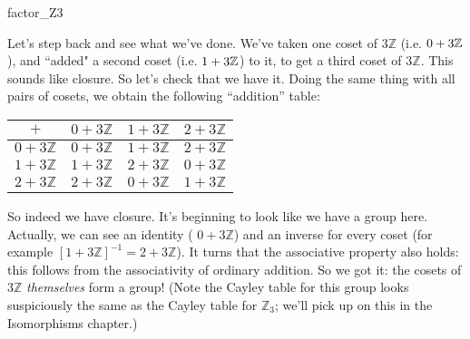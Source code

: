 {\begin{example}{factor_Z3}
%
%
%
%
%

Let's step back and see what we've done. We've taken one coset of $ 3 {\mathbb Z}$ (i.e. $0 + 3\mathbb{Z}$), and ``added" a second coset (i.e. $1 + 3\mathbb{Z}$) to it, to get a third coset of $ 3 {\mathbb Z}$. This sounds like closure.  So let's check that we have it.  Doing the same thing with all pairs of cosets, we obtain the following ``addition'' table: 

\begin{center}
\begin{tabular}{c|ccc}
$+$             & $0 + 3{\mathbb Z}$ & $1 + 3{\mathbb Z}$ & $2 + 3{\mathbb Z}$ \\\hline
$0 + 3{\mathbb Z}$ & $0 + 3{\mathbb Z}$ & $1 + 3{\mathbb Z}$ & $2 + 3{\mathbb Z}$ \\
$1 + 3{\mathbb Z}$ & $1 + 3{\mathbb Z}$ & $2 + 3{\mathbb Z}$ & $0 + 3{\mathbb Z}$ \\
$2 + 3{\mathbb Z}$ & $2 + 3{\mathbb Z}$ & $0 + 3{\mathbb Z}$ & $1 + 3{\mathbb Z}$
\end{tabular}
\end{center}

So indeed we have closure.  It's beginning to look like we have a group here. Actually,  we can see an identity ( $0 + 3 {\mathbb Z}$) and an inverse for every coset (for example $[1 + 3 {\mathbb Z}]^{-1}=2 + 3 {\mathbb Z}$). It turns that the associative property also holds: this follows from the associativity of ordinary addition. So we got it: the cosets of $3 {\mathbb Z}$ \emph{themselves} form a group!  (Note the Cayley table for this group looks suspiciously the same as the Cayley table for ${\mathbb Z}_3$; we'll pick up on this in the Isomorphisms chapter.)  
\end{example}

}
